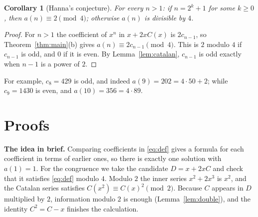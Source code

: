 \documentclass[11pt,a4paper]{article}
\newtheorem{corollary}[theorem]{Corollary}
\theoremstyle{definition}
\theoremstyle{remark}
\newcommand{\para}[1]{\par\medskip\noindent\textbf{#1}\enspace}
\begin{document}
\begin{corollary}[Hanna's conjecture]\label{cor:conj}
For every $n>1$: if $n=2^k+1$ for some $k\ge0$, then $a(n)\equiv2\pmod4$; otherwise $a(n)$ is divisible by $4$.
\end{corollary}

\begin{proof}
For $n>1$ the coefficient of $x^n$ in $x+2xC(x)$ is $2c_{n-1}$, so Theorem~\ref{thm:main}(b) gives
$a(n)\equiv2c_{n-1}\pmod4$. This is $2$ modulo $4$ if $c_{n-1}$ is odd, and $0$ if it is even. By
Lemma~\ref{lem:catalan}, $c_{n-1}$ is odd exactly when $n-1$ is a power of $2$.
\end{proof}

For example, $c_8=429$ is odd, and indeed $a(9)=202=4\cdot50+2$; while $c_9=1430$ is even, and $a(10)=356=4\cdot89$.

\section{Proofs}\label{sec:proofs}

\para{The idea in brief.} Comparing coefficients in \eqref{eq:def} gives a formula for each coefficient in terms of
earlier ones, so there is exactly one solution with $a(1)=1$. For the congruence we take the candidate $D=x+2xC$ and check
that it satisfies \eqref{eq:def} modulo $4$. Modulo $2$ the inner series $x^2+2x^3$ is $x^2$, and the Catalan series
satisfies $C(x^2)\equiv C(x)^2\pmod 2$. Because $C$ appears in $D$ multiplied by $2$, information modulo $2$ is enough
(Lemma~\ref{lem:double}), and the identity $C^2=C-x$ finishes the calculation.
\end{document}
